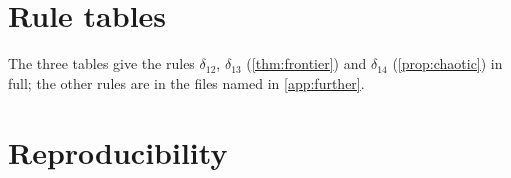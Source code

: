 \appendix
\makeatletter
\gdef\thesection{Appendix~\@Alph\c@section}
\makeatother





\section{Rule tables}\label{app:delta12}

The three tables give the rules $\delta_{12}$, $\delta_{13}$ (\cref{thm:frontier})
and $\delta_{14}$ (\cref{prop:chaotic}) in full; the other rules are in the
files named in \cref{app:further}.







\section{Reproducibility}\label{app:repro}

